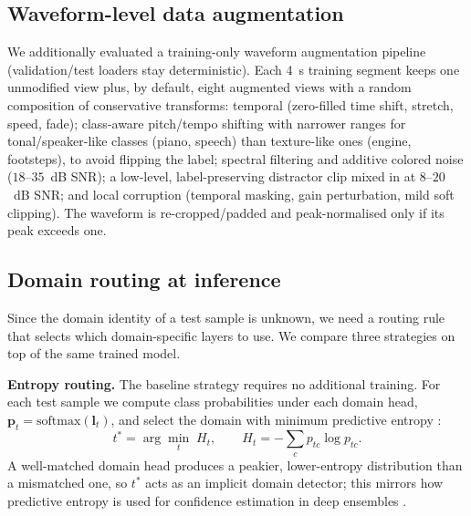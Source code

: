 \documentclass[9pt,conference]{IEEEtran}
\begin{document}
\subsection{Waveform-level data augmentation}
\label{ssec:data_aug}
We additionally evaluated a training-only waveform augmentation pipeline
(validation/test loaders stay deterministic). Each 4~s training segment
keeps one unmodified view plus, by default, eight augmented views with a
random composition of conservative transforms: temporal (zero-filled time
shift, stretch, speed, fade); class-aware pitch/tempo shifting with
narrower ranges for tonal/speaker-like classes (piano, speech) than
texture-like ones (engine, footsteps), to avoid flipping the label; spectral
filtering and additive colored noise ($18$--$35$~dB SNR); a low-level,
label-preserving distractor clip mixed in at $8$--$20$~dB SNR; and local
corruption (temporal masking, gain perturbation, mild soft clipping). The
waveform is re-cropped/padded and peak-normalised only if its peak exceeds
one.

\subsection{Domain routing at inference}
\label{ssec:routing}

Since the domain identity of a test sample is unknown, we need a routing
rule that selects which domain-specific layers to use. We compare three
strategies on top of the same trained model.

\noindent\textbf{Entropy routing.} The baseline strategy requires no
additional training. For each test sample we compute class probabilities
under each domain head, $\mathbf{p}_t = \mathrm{softmax}(\mathbf{l}_t)$,
and select the domain with minimum predictive entropy
\cite{mulimani2025dil}:
\begin{equation}
  \label{eqn:entropy_routing}
  t^* = \arg\min_{t}\; H_t, \qquad
  H_t = -\sum_{c} p_{tc}\log p_{tc}.
\end{equation}
A well-matched domain head produces a peakier, lower-entropy distribution
than a mismatched one, so $t^*$ acts as an implicit domain detector; this
mirrors how predictive entropy is used for confidence estimation in deep
ensembles \cite{lakshminarayanan2017ensembles}.
\end{document}
